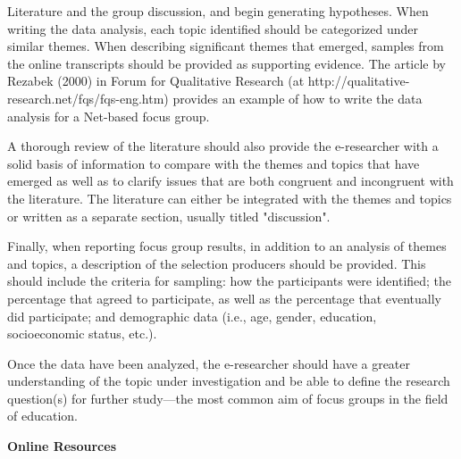 

\noindent 

\noindent 

\noindent 

\noindent 

\noindent 



\noindent \textbf{                                                                                                   }

\noindent                                                                                                             

\noindent Literature and the group discussion, and begin generating hypotheses. When writing the data analysis, each topic identified should be categorized under similar themes. When describing significant themes that emerged, samples from the online transcripts should be provided as supporting evidence. The article by Rezabek (2000) in Forum for Qualitative Research (at http://qualitative-research.net/fqs/fqs-eng.htm) provides an example of how to write the data analysis for a Net-based focus group. 

\noindent       A thorough review of the literature should also provide the e-researcher with a solid basis of information to compare with the themes and topics that have emerged as well as to clarify issues that are both congruent and incongruent with the literature. The literature can either be integrated with the themes and topics or written as a separate section, usually titled "discussion".

\noindent       Finally, when reporting focus group results, in addition to an analysis of themes and topics, a description of the selection producers should be provided. This should include the criteria for sampling: how the participants were identified; the percentage that agreed to participate, as well as the percentage that eventually did participate; and demographic data (i.e., age, gender, education, socioeconomic status, etc.).

\noindent      Once the data have been analyzed, the e-researcher should have a greater understanding of the topic under investigation and be able to define the research question(s) for further study---the most common aim of focus groups in the field of education.

\noindent \textbf{Online Resources}

